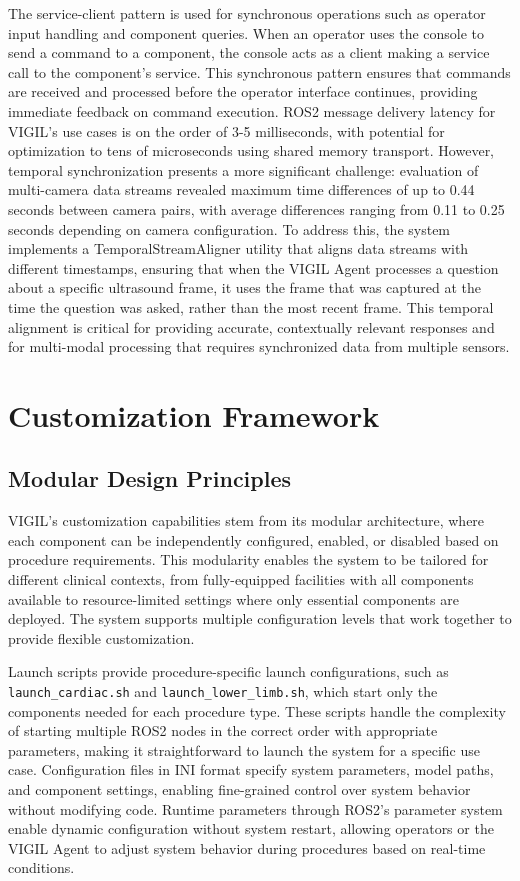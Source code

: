 \documentclass[12pt,a4paper]{article}
\begin{document}
The service-client pattern is used for synchronous operations such as operator input handling and component queries. When an operator uses the console to send a command to a component, the console acts as a client making a service call to the component's service. This synchronous pattern ensures that commands are received and processed before the operator interface continues, providing immediate feedback on command execution. ROS2 message delivery latency for VIGIL's use cases is on the order of 3-5 milliseconds, with potential for optimization to tens of microseconds using shared memory transport. However, temporal synchronization presents a more significant challenge: evaluation of multi-camera data streams revealed maximum time differences of up to 0.44 seconds between camera pairs, with average differences ranging from 0.11 to 0.25 seconds depending on camera configuration. To address this, the system implements a TemporalStreamAligner utility that aligns data streams with different timestamps, ensuring that when the VIGIL Agent processes a question about a specific ultrasound frame, it uses the frame that was captured at the time the question was asked, rather than the most recent frame. This temporal alignment is critical for providing accurate, contextually relevant responses and for multi-modal processing that requires synchronized data from multiple sensors.

\section{Customization Framework}

\subsection{Modular Design Principles}

VIGIL's customization capabilities stem from its modular architecture, where each component can be independently configured, enabled, or disabled based on procedure requirements. This modularity enables the system to be tailored for different clinical contexts, from fully-equipped facilities with all components available to resource-limited settings where only essential components are deployed. The system supports multiple configuration levels that work together to provide flexible customization.

Launch scripts provide procedure-specific launch configurations, such as \texttt{launch\_cardiac.sh} and \texttt{launch\_lower\_limb.sh}, which start only the components needed for each procedure type. These scripts handle the complexity of starting multiple ROS2 nodes in the correct order with appropriate parameters, making it straightforward to launch the system for a specific use case. Configuration files in INI format specify system parameters, model paths, and component settings, enabling fine-grained control over system behavior without modifying code. Runtime parameters through ROS2's parameter system enable dynamic configuration without system restart, allowing operators or the VIGIL Agent to adjust system behavior during procedures based on real-time conditions.
\end{document}
